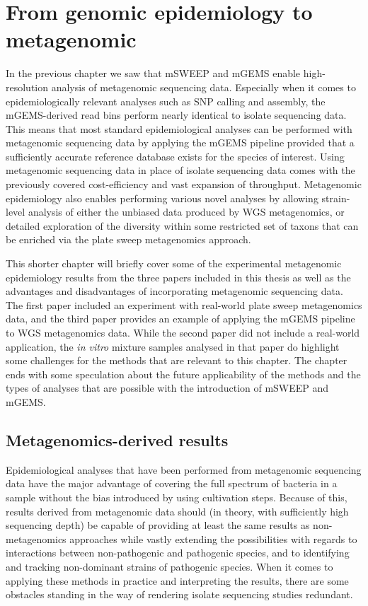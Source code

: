 \documentclass[officiallayout]{tktla}
\begin{document}
\section{From genomic epidemiology to metagenomic}

In the previous chapter we saw that mSWEEP and mGEMS enable
high-resolution analysis of metagenomic sequencing data. Especially
when it comes to epidemiologically relevant analyses such as SNP
calling and assembly, the mGEMS-derived read bins perform nearly
identical to isolate sequencing data. This means that most standard
epidemiological analyses can be performed with metagenomic sequencing
data by applying the mGEMS pipeline \textemdash provided that a
sufficiently accurate reference database exists for the species of
interest. Using metagenomic sequencing data in place of isolate
sequencing data comes with the previously covered cost-efficiency and
vast expansion of throughput. Metagenomic epidemiology also enables
performing various novel analyses by allowing strain-level analysis of
either the unbiased data produced by WGS metagenomics, or detailed
exploration of the diversity within some restricted set of taxons that
can be enriched via the plate sweep metagenomics approach.

This shorter chapter will briefly cover some of the experimental metagenomic
epidemiology results from the three papers included in this thesis as
well as the advantages and disadvantages of incorporating metagenomic
sequencing data. The first paper included an experiment with
real-world plate sweep metagenomics data, and the third paper provides
an example of applying the mGEMS pipeline to WGS metagenomics
data. While the second paper did not include a real-world application,
the \textit{in vitro} mixture samples analysed in that paper do
highlight some challenges for the methods that are relevant to this
chapter. The chapter ends with some speculation about the future
applicability of the methods and the types of analyses that are
possible with the introduction of mSWEEP and mGEMS.

\subsection{Metagenomics-derived results}

Epidemiological analyses that have been performed from metagenomic
sequencing data have the major advantage of covering the full spectrum
of bacteria in a sample without the bias introduced by using
cultivation steps. Because of this, results derived from metagenomic
data should (in theory, with sufficiently high sequencing depth) be
capable of providing at least the same results as non-metagenomics
approaches while vastly extending the possibilities with regards to
interactions between non-pathogenic and pathogenic species, and to
identifying and tracking non-dominant strains of pathogenic
species. When it comes to applying these methods in practice and
interpreting the results, there are some obstacles standing in the way
of rendering isolate sequencing studies redundant.
\end{document}
